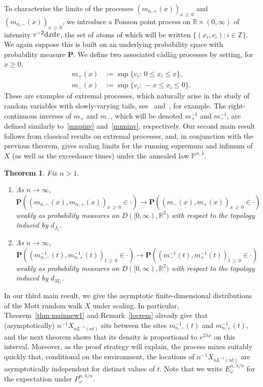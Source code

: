 \documentclass[10pt]{amsart}
\newtheorem{theo}{Theorem}[section]
\theoremstyle{definition}\newtheorem{defi}[theo]{Definition}\newtheorem{rema}[theo]{Remark}\newtheorem{exam}[theo]{Example}\newtheorem{exem}[theo]{Example}\newtheorem{nota}[theo]{Notation}
\newcommand{\Z}{\mathbb Z}
\newcommand{\R}{\mathbb R}
\renewcommand{\P}{\mathbb P}
\newcommand{\bfP}{\mathbf{P}}
\newcommand{\dd}{\text{\upshape{d}}}
\newcommand{\cadlag}{càdlàg }
\newcommand*{\alphenumi}{\renewcommand*{\theenumi}{\alph{enumi}}}
\begin{document}
To characterise the limits of the processes $(m_{n,+}(x))_{x\,\geq\,0}$ and $(m_{n,-}(x))_{x\,\geq\,0}$, we introduce a Poisson point process on $\R\times (0,\infty)$ of intensity $v^{-2}\dd x\dd v$, the set of atoms of which will be written $\{(x_i,v_i):i\in\Z\}$. We again suppose this is built on an underlying probability space with probability measure $\bfP$. We define two associated \cadlag processes by setting, for $x\geq 0$,
\begin{align}
m_+(x)&:=\sup\{v_i:\:0\leq x_i\leq x\},\label{mplus}
\\
m_-(x)&:=\sup\{v_i:\:-x\leq x_i\leq 0\}.\label{mminus}
\end{align}
These are examples of extremal processes, which naturally arise in the study of random variables with slowly-varying tails, see~\cite{Kasa} and~\cite[Chapter~4]{Res87}, for example. The right-continuous inverses of $m_+$ and $m_-$, which will be denoted $m_+^{-1}$ and $m_-^{-1}$, are defined similarly to~\eqref{mnpinv} and~\eqref{mnninv}, respectively. Our second main result follows from classical results on extremal processes, and, in conjunction with the previous theorem, gives scaling limits for the running supremum and infimum of $X$ (as well as the exceedance times) under the annealed law $\P^{\alpha,\lambda}$.

\begin{theo}\label{thm:mainnew2}
Fix $\alpha>1$.
\begin{enumerate}\alphenumi
\item\label{theo1.3.a} As $n\rightarrow\infty$,
\[
\bfP\left(\left(m_{n,-}(x),m_{n,+}(x)\right)_{x\,\geq\,0}\in\cdot\right)\rightarrow\bfP\left(\left(m_-(x),m_+(x)\right)_{x\,\geq\,0}\in\cdot\right)
\]
weakly as probability measures on $D([0,\infty),\R^2)$ with respect to the topology induced by $d_{J_1}$. 
\item\label{theo1.3.b} As $n\rightarrow\infty$,
\[
\bfP\left(\left(m_{n,-}^{-1}(t),m_{n,+}^{-1}(t)\right)_{t\,\geq\,0}\in\cdot\right)\rightarrow\bfP\left(\left(m_-^{-1}(t),m_+^{-1}(t)\right)_{t\,\geq\,0}\in\cdot\right)
\]
weakly as probability measures on $D([0,\infty),\R^2)$ with respect to the topology induced by $d_{M_1}$.
\end{enumerate}
\end{theo}

In our third main result, we give the asymptotic finite-dimensional distributions of the Mott random walk $X$ under scaling. In particular, Theorem~\ref{thm:mainnew1} and Remark~\ref{locrem} already give that (asymptotically) $n^{-1}{X}_{nL^{-1}(nt)}$ sits between the sites $m_{n,-}^{-1}(t)$ and $m_{n,+}^{-1}(t)$, and the next theorem shows that its density is proportional to $e^{2\lambda x}$ on this interval. Moreover, as the proof strategy will explain, the process mixes suitably quickly that, conditional on the environment, the locations of $n^{-1}{X}_{nL^{-1}(nt)}$ are asymptotically independent for distinct values of $t$. Note that we write $E^{\alpha,\lambda/n}_\omega$ for the expectation under $P^{\alpha,\lambda/n}_\omega$.
\end{document}
